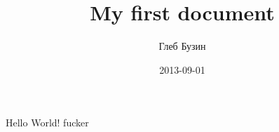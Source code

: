 \documentclass[a4paper,12pt]{article}
\title{My first document}
\date{2013-09-01}
\author{Глеб Бузин}
\begin{document}
  \maketitle
  \newpage
  Hello World!
  fucker
\end{document}
